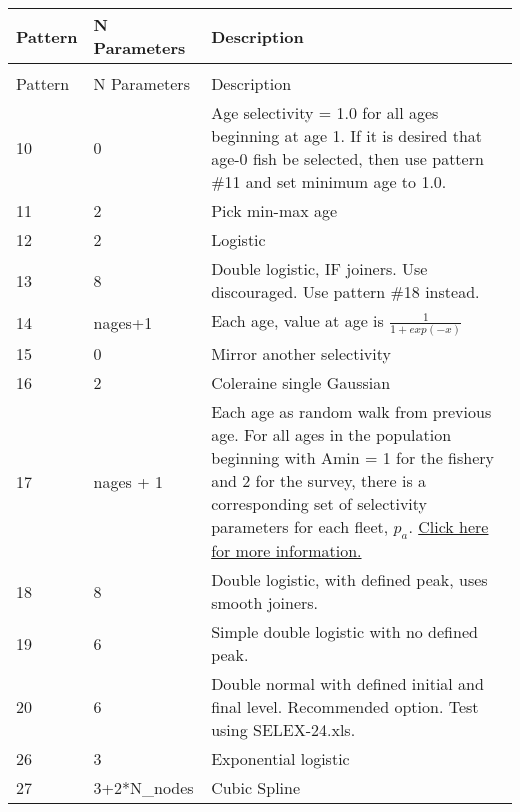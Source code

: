 \begin{center}
	\begin{longtable}{p{2cm} p{3cm} p{10cm}}

		\endfirsthead

		\hline
		Pattern & N Parameters & Description \\
		\hline
		\endhead

		\endfoot
		\endlastfoot

		\hline
		\multicolumn{3}{c}{AGE SELECTIVITY}\\
		Pattern & N Parameters & Description \\
		\hline
		10 & 0 & Age selectivity = 1.0 for all ages beginning at age 1.  If it is desired that age-0 fish be selected, then use pattern \#11 and set minimum age to 1.0. \\
		11 & 2 & Pick min-max age\\
		12 & 2 & Logistic\\
		13 & 8 & Double logistic, IF joiners.  Use discouraged.  Use pattern \#18 instead.\\
		14 & nages+1 & Each age, value at age is $\frac{1}{1+exp(-x)}$ \\
		15 & 0 & Mirror another selectivity\\
		16 & 2 & Coleraine single Gaussian\\
		17 & nages + 1 & Each age as random walk from previous age.  For all ages in the population beginning with Amin = 1 for the fishery and 2 for the survey, there is a corresponding set of selectivity parameters for each fleet, $p_a$. \hyperlink{RandWalk}{Click here for more information.}\\
		18 & 8 & Double logistic, with defined peak, uses smooth joiners.  \\
		19 & 6 & Simple double logistic with no defined peak.\\
		20 & 6 & Double normal with defined initial and final level.  Recommended option. Test using SELEX-24.xls.\\
		26 & 3 & Exponential logistic\\
		27 & 3+2*N\_nodes & Cubic Spline\\
		\hline
	\end{longtable}
\end{center}

